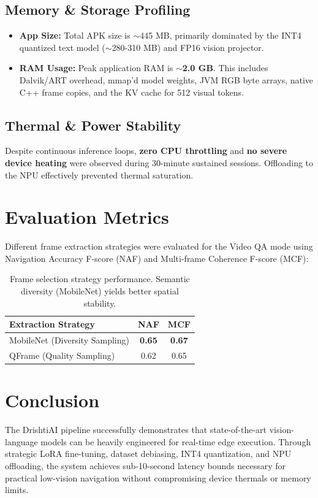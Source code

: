 \documentclass[11pt,a4paper]{article}
\begin{document}
\subsection{Memory \& Storage Profiling}
\begin{itemize}
    \item \textbf{App Size:} Total APK size is $\sim$445 MB, primarily dominated by the INT4 quantized text model ($\sim$280-310 MB) and FP16 vision projector.
    \item \textbf{RAM Usage:} Peak application RAM is \textbf{$\sim$2.0 GB}. This includes Dalvik/ART overhead, mmap'd model weights, JVM RGB byte arrays, native C++ frame copies, and the KV cache for 512 visual tokens.
\end{itemize}

\subsection{Thermal \& Power Stability}
Despite continuous inference loops, \textbf{zero CPU throttling} and \textbf{no severe device heating} were observed during 30-minute sustained sessions. Offloading to the NPU effectively prevented thermal saturation.

\section{Evaluation Metrics}
Different frame extraction strategies were evaluated for the Video QA mode using Navigation Accuracy F-score (NAF) and Multi-frame Coherence F-score (MCF):
\begin{table}[H]
\centering
\begin{tabular}{@{}lcc@{}}
\toprule
\textbf{Extraction Strategy} & \textbf{NAF} & \textbf{MCF} \\ \midrule
MobileNet (Diversity Sampling) & \textbf{0.65} & \textbf{0.67} \\
QFrame (Quality Sampling) & 0.62 & 0.65 \\ \bottomrule
\end{tabular}
\caption{Frame selection strategy performance. Semantic diversity (MobileNet) yields better spatial stability.}
\end{table}

\section{Conclusion}
The DrishtiAI pipeline successfully demonstrates that state-of-the-art vision-language models can be heavily engineered for real-time edge execution. Through strategic LoRA fine-tuning, dataset debiasing, INT4 quantization, and NPU offloading, the system achieves sub-10-second latency bounds necessary for practical low-vision navigation without compromising device thermals or memory limits.
\end{document}

